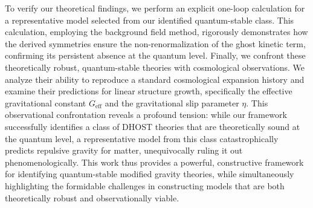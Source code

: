 \documentclass[twocolumn]{aastex631}
\begin{document}
To verify our theoretical findings, we perform an explicit one-loop calculation for a representative model selected from our identified quantum-stable class. This calculation, employing the background field method, rigorously demonstrates how the derived symmetries ensure the non-renormalization of the ghost kinetic term, confirming its persistent absence at the quantum level. Finally, we confront these theoretically robust, quantum-stable theories with cosmological observations. We analyze their ability to reproduce a standard cosmological expansion history and examine their predictions for linear structure growth, specifically the effective gravitational constant $G_{\text{eff}}$ and the gravitational slip parameter $\eta$. This observational confrontation reveals a profound tension: while our framework successfully identifies a class of DHOST theories that are theoretically sound at the quantum level, a representative model from this class catastrophically predicts repulsive gravity for matter, unequivocally ruling it out phenomenologically. This work thus provides a powerful, constructive framework for identifying quantum-stable modified gravity theories, while simultaneously highlighting the formidable challenges in constructing models that are both theoretically robust and observationally viable.
\end{document}
